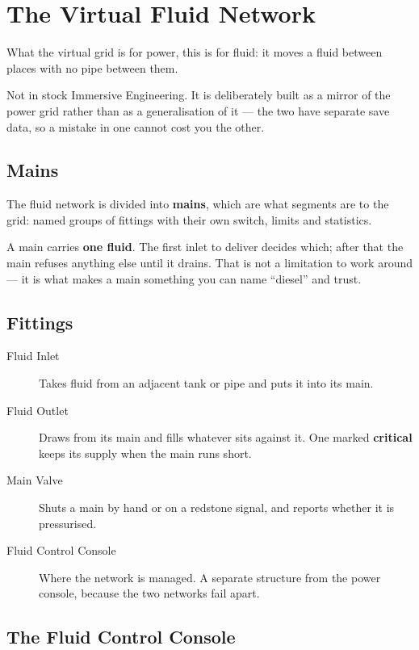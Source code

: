 \chapter{The Virtual Fluid Network}
\label{ch:fluidnet}

What the virtual grid is for power, this is for fluid: it moves a fluid between places with no pipe
between them.

\begin{iefork}
Not in stock Immersive Engineering. It is deliberately built as a mirror of the power grid rather
than as a generalisation of it --- the two have separate save data, so a mistake in one cannot cost
you the other.
\end{iefork}

\section{Mains}

The fluid network is divided into \textbf{mains}, which are what segments are to the grid: named
groups of fittings with their own switch, limits and statistics.

A main carries \textbf{one fluid}. The first inlet to deliver decides which; after that the main
refuses anything else until it drains. That is not a limitation to work around --- it is what makes
a main something you can name ``diesel'' and trust.

\section{Fittings}

\begin{description}
\item[Fluid Inlet] Takes fluid from an adjacent tank or pipe and puts it into its main.
\item[Fluid Outlet] Draws from its main and fills whatever sits against it. One marked
      \textbf{critical} keeps its supply when the main runs short.
\item[Main Valve] Shuts a main by hand or on a redstone signal, and reports whether it is
      pressurised.
\item[Fluid Control Console] Where the network is managed. A separate structure from the power
      console, because the two networks fail apart.
\end{description}

\section{The Fluid Control Console}

